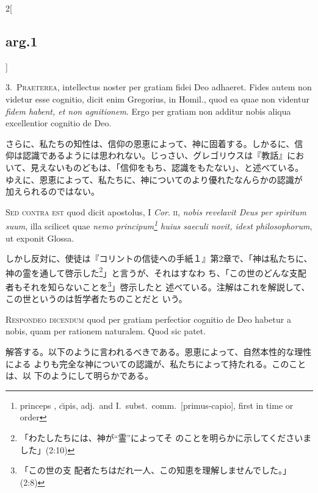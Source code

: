 \documentclass[paper=a4paper,fontsize=10pt,jafontsize=9pt,titlepage]{jlreq}
\begin{document}
\begin{paracol}{2}[\subsection{arg.1}]

3.~{\scshape Praeterea}, intellectus noster per gratiam fidei Deo
adhaeret. Fides autem non videtur esse cognitio, dicit enim Gregorius,
in Homil., quod ea quae non videntur {\itshape fidem habent, et non
agnitionem}. Ergo per gratiam non additur nobis aliqua excellentior
cognitio de Deo.

\switchcolumn

さらに、私たちの知性は、信仰の恩恵によって、神に固着する。しかるに、信
仰は認識であるようには思われない。じっさい、グレゴリウスは『教話』にお
いて、見えないものどもは、「信仰をもち、認識をもたない」、と述べている。
ゆえに、恩恵によって、私たちに、神についてのより優れたなんらかの認識が
加えられるのではない。

\switchcolumn*[\subsection{s.c.}]

{\scshape Sed contra est} quod dicit apostolus, I {\itshape Cor}. {\scshape ii}, {\itshape
nobis revelavit Deus per spiritum suum}, illa scilicet quae {\itshape nemo
principum\footnote{princeps , c\u{\i}pis, adj.\ and I.~subst.\ comm.\
[primus-capio], first in time or order} huius saeculi novit, idest
philosophorum}, ut exponit Glossa.

\switchcolumn

しかし反対に、使徒は『コリントの信徒への手紙１』第2章で、「神は私たちに、
神の霊を通して啓示した\footnote{「わたしたちには、神が``霊''によってそ
のことを明らかに示してくださいました」(2:10)}」と言うが、それはすなわ
ち、「この世のどんな支配者もそれを知らないことを\footnote{「この世の支
配者たちはだれ一人、この知恵を理解しませんでした。」(2:8)}」啓示したと
述べている。注解はこれを解説して、この世というのは哲学者たちのことだと
いう。


{\scshape Respondeo dicendum} quod per gratiam perfectior cognitio de Deo
habetur a nobis, quam per rationem naturalem. Quod sic patet.

\switchcolumn

解答する。以下のように言われるべきである。恩恵によって、自然本性的な理性による
よりも完全な神についての認識が、私たちによって持たれる。このことは、以
下のようにして明らかである。


\end{paracol}
\end{document}
